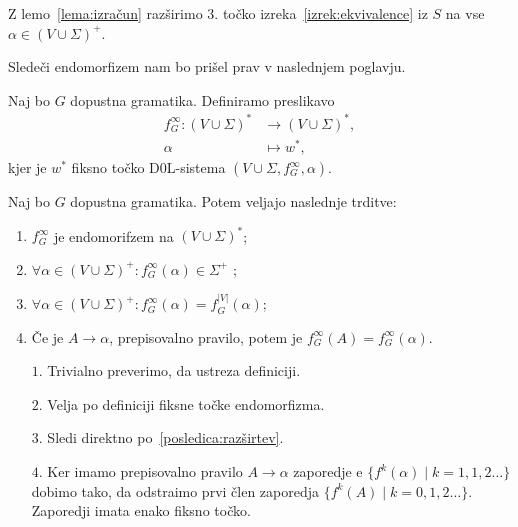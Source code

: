 \documentclass[fin1, tisk]{fmfdelo}
\providecommand{\abs}[1]{\left\lvert #1 \right\rvert}
\theoremstyle{definition}
\begin{document}
\begin{dokaz}
    Z lemo~\ref{lema:izračun} razširimo $3.$ točko izreka~\ref{izrek:ekvivalence} iz $S$ na 
    vse $\alpha \in (V \cup \Sigma)^+$.
\end{dokaz}

Sledeči endomorfizem nam bo prišel prav v naslednjem poglavju.

\begin{definicija}\label{def:InftyEndo}
    Naj bo $G$ dopustna gramatika. Definiramo preslikavo
    \begin{align*}
        f_G^\infty \colon (V \cup \Sigma)^* &\to (V \cup \Sigma)^*, \\
        \alpha &\mapsto w^*,
    \end{align*}
    kjer je $w^*$ fiksno točko D$0$L-sistema $(V \cup \Sigma, f_G^\infty, \alpha)$.
\end{definicija}

\begin{trditev}
    Naj bo $G$ dopustna gramatika. Potem veljajo naslednje trditve:
    \begin{enumerate}
        \item $f_G^\infty$ je endomorifzem na $(V \cup \Sigma)^*$;
        \item $\forall \alpha \in (V \cup \Sigma)^+ \colon f_G^\infty(\alpha) \in \Sigma^+$ ;
        \item $\forall \alpha \in (V \cup \Sigma)^+ \colon f_G^\infty(\alpha) = f_G^{\abs{V}}(\alpha)$;
        \item Če je $A \rightarrow \alpha$, prepisovalno pravilo, potem je 
        $f_G^\infty(A) = f_G^\infty(\alpha)$.
    \end{enumerate}
\end{trditev}

\begin{dokaz}
    \mbox{}
    \begin{itemize}
        \item[$1.$] Trivialno preverimo, da ustreza definiciji.
        \item [$2.$] Velja po definiciji fiksne točke endomorfizma.
        \item[$3.$] Sledi direktno po~\ref{posledica:razširtev}.
        \item[$4.$] Ker imamo prepisovalno pravilo $A \rightarrow \alpha$ zaporedje e
        $\{ f^k(\alpha) \mid k = 1, 1,2 \ldots \}$ dobimo tako, da odstraimo prvi člen zaporedja
        $\{ f^k(A) \mid k = 0, 1,2 \ldots \}$. Zaporedji imata enako fiksno točko.
    \end{itemize}
\end{dokaz}
\end{document}
